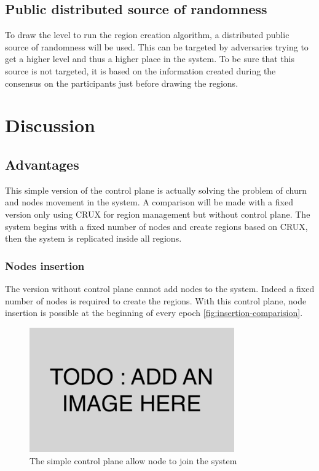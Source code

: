 \documentclass[a4paper,11pt,oneside]{report}
\begin{document}
\subsection{Public distributed source of randomness}
To draw the level to run the region creation algorithm, a distributed public
source of randomness will be used. This can be targeted by adversaries trying to
get a higher level and thus a higher place in the system. To be sure that this
source is not targeted, it is  based on the information created during the
consensus on the participants just before drawing the regions. 

\FloatBarrier
\section{Discussion}
\subsection{Advantages}
This simple version of the control plane is actually solving the problem of
churn and nodes movement in the system. A comparison will be made with a fixed
version only using CRUX for region management but without control plane. The
system begins with a fixed number of nodes and create regions based on CRUX,
then the system is replicated inside all regions. 

\subsubsection{Nodes insertion}
The version without control plane cannot add nodes to the system. Indeed a
fixed number of nodes is required to create the regions. With this control
plane, node insertion is possible at the beginning of every epoch
\autoref{fig:insertion-comparision}.

\begin{figure}[!h] 
\centering
\includegraphics[width=250pt]{figures/todo}
\caption{The simple control plane allow node to join the system}
\label{fig:insertion-comparision}
\end{figure}
\end{document}
